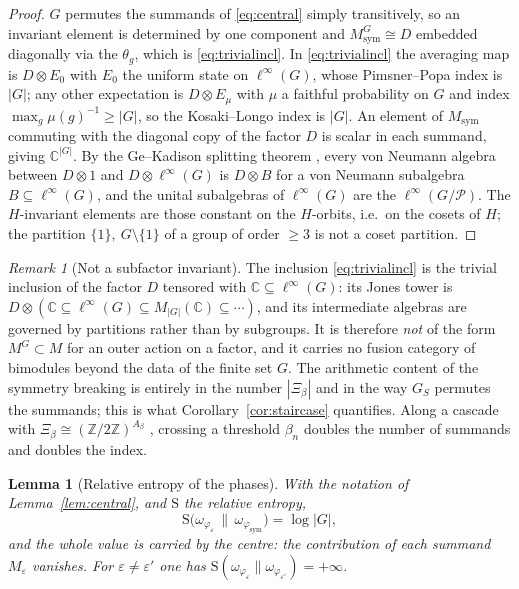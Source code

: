 \documentclass[11pt]{amsart}
\numberwithin{equation}{section}
\newtheorem{lemma}[theorem]{Lemma}
\theoremstyle{definition}
\theoremstyle{remark}
\newtheorem{remark}[theorem]{Remark}
\newcommand{\Z}{\mathbb{Z}}
\newcommand{\C}{\mathbb{C}}
\newcommand{\Ent}{\mathrm{S}}
\newcommand{\Msym}{M_{\mathrm{sym}}}
\newcommand{\phisym}{\varphi_{\mathrm{sym}}}
\begin{document}
\begin{proof}
$G$ permutes the summands of \eqref{eq:central} simply transitively, so an invariant element
is determined by one component and $\Msym^G\cong D$ embedded diagonally via the $\theta_g$,
which is \eqref{eq:trivialincl}. In \eqref{eq:trivialincl} the averaging map is
$D\otimes E_0$ with $E_0$ the uniform state on $\ell^\infty(G)$, whose Pimsner--Popa index
is $|G|$; any other expectation is $D\otimes E_\mu$ with $\mu$ a faithful probability on
$G$ and index $\max_g\mu(g)^{-1}\ge|G|$, so the Kosaki--Longo index is $|G|$. An element of
$\Msym$ commuting with the diagonal copy of the factor $D$ is scalar in each summand, giving
$\C^{|G|}$. By the Ge--Kadison splitting theorem \cite{GK}, every von Neumann algebra
between $D\otimes1$ and $D\otimes\ell^\infty(G)$ is $D\otimes B$ for a von Neumann
subalgebra $B\subseteq\ell^\infty(G)$, and the unital subalgebras of $\ell^\infty(G)$ are the
$\ell^\infty(G/\mathcal P)$. The $H$-invariant elements are those constant on the
$H$-orbits, i.e.\ on the cosets of $H$; the partition $\{1\},\ G\setminus\{1\}$ of a group of
order $\ge3$ is not a coset partition.
\end{proof}

\begin{remark}[Not a subfactor invariant]\label{rem:nostandard}
The inclusion \eqref{eq:trivialincl} is the trivial inclusion of the factor $D$ tensored
with $\C\subseteq\ell^\infty(G)$: its Jones tower is $D\otimes(\C\subseteq\ell^\infty(G)\subseteq
M_{|G|}(\C)\subseteq\cdots)$, and its intermediate algebras are governed by partitions rather
than by subgroups. It is therefore \emph{not} of the form $M^G\subset M$ for an outer action
on a factor, and it carries no fusion category of bimodules beyond the data of the finite set
$G$. The arithmetic content of the symmetry breaking is entirely in the number $|\Xi_\beta|$
and in the way $G_S$ permutes the summands; this is what Corollary~\ref{cor:staircase}
quantifies. Along a cascade with $\Xi_\beta\cong(\Z/2\Z)^{A_\beta}$ \cite[Prop.~4.16]{Main},
crossing a threshold $\beta_n$ doubles the number of summands and doubles the index.
\end{remark}

\begin{lemma}[Relative entropy of the phases]\label{lem:relent}
With the notation of Lemma~\ref{lem:central}, and $\Ent$ the relative entropy,
\[
\Ent\bigl(\omega_{\varphi_\varepsilon}\,\big\|\,\omega_{\phisym}\bigr)=\log|G| ,
\]
and the whole value is carried by the centre: the contribution of each summand
$M_\varepsilon$ vanishes. For $\varepsilon\ne\varepsilon'$ one has
$\Ent(\omega_{\varphi_\varepsilon}\|\omega_{\varphi_{\varepsilon'}})=+\infty$.
\end{lemma}
\end{document}
